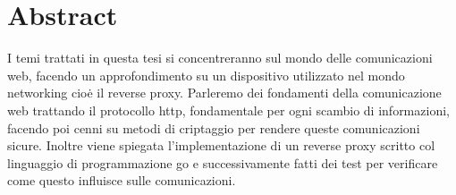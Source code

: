 \chapter*{Abstract}
\label{cha:abtract}
I temi trattati in questa tesi si concentreranno sul mondo delle comunicazioni web, facendo un approfondimento su un dispositivo utilizzato nel mondo networking cioė il reverse proxy. Parleremo dei fondamenti della comunicazione web trattando il protocollo http, fondamentale per ogni scambio di informazioni, facendo poi cenni su metodi di criptaggio per rendere queste comunicazioni sicure. Inoltre viene spiegata l'implementazione di un reverse proxy scritto col linguaggio di programmazione go e successivamente fatti dei test per verificare come questo influisce sulle comunicazioni.
